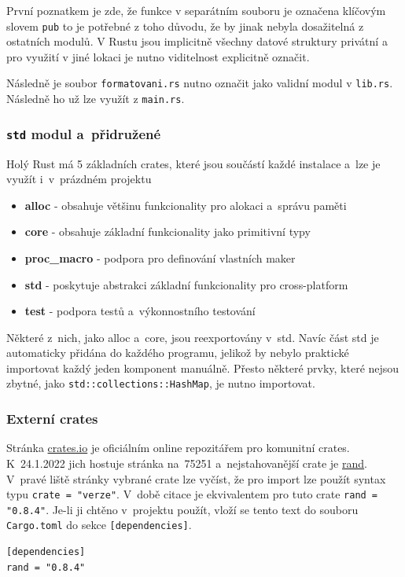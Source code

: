 \documentclass[a4paper, 12pt, twoside]{article} %
\newcommand{\rust}[1]{\texttt{#1}}
\begin{document}
		První poznatkem je zde, že funkce v separátním souboru je označena klíčovým slovem \texttt{pub} to je potřebné z toho důvodu, že by jinak nebyla dosažitelná z ostatních modulů. V Rustu jsou implicitně všechny datové struktury privátní a pro využití v jiné lokaci je nutno viditelnost explicitně označit.
		
		Následně je soubor \texttt{formatovani.rs} nutno označit jako validní modul v \texttt{lib.rs}. Následně ho už lze využít z \texttt{main.rs}.
		
		\subsubsection*{\rust{std} modul a~přidružené}
			Holý Rust má 5 základních crates, které jsou součástí každé instalace a~lze je využít i~v~prázdném projektu
			\begin{itemize}
				\item \textbf{alloc} - obsahuje většinu funkcionality pro alokaci a~správu paměti
				\item \textbf{core} - obsahuje základní funkcionality jako primitivní typy
				\item \textbf{proc\_macro} - podpora pro definování vlastních maker
				\item \textbf{std} - poskytuje abstrakci základní funkcionality pro cross-platform
				\item \textbf{test} - podpora testů a~výkonnostního testování
			\end{itemize}

			Některé z~nich, jako alloc a~core, jsou reexportovány v~std. Navíc část std je automaticky přidána do každého programu, jelikož by nebylo praktické importovat každý jeden komponent manuálně. Přesto některé prvky, které nejsou zbytné, jako \rust{std::collections::HashMap}, je nutno importovat.

		\subsubsection*{Externí crates}
			Stránka \href{https://crates.io/}{crates.io} je oficiálním online repozitářem pro komunitní crates. K~24.1.2022 jich hostuje stránka na~75251 a~nejstahovanější crate je \href{https://crates.io/crates/rand}{rand}. V~pravé liště stránky vybrané crate lze vyčíst, že pro import lze použít syntax typu \texttt{crate = "verze"}. V~době citace je ekvivalentem pro tuto crate \texttt{rand = "0.8.4"}. Je-li ji chtěno v~projektu použít, vloží se tento text do souboru \texttt{Cargo.toml} do sekce \texttt{[dependencies]}.
			\begin{verbatim}
[dependencies]
rand = "0.8.4"
			\end{verbatim}
		
\end{document}
